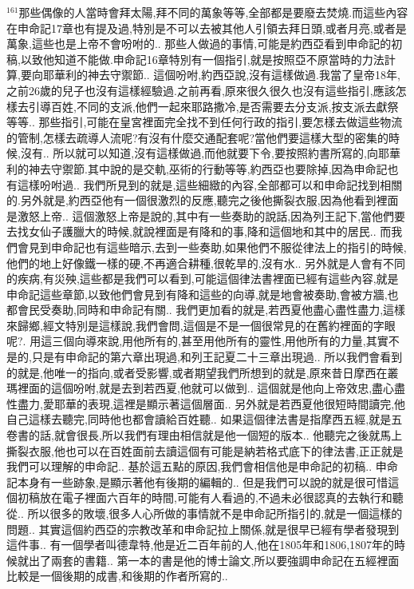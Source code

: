 \documentclass{book}
\begin{document}
$^{161}$那些偶像的人當時會拜太陽,拜不同的萬象等等,全部都是要廢去焚燒.而這些內容在申命記17章也有提及過,特別是不可以去被其他人引領去拜日頭,或者月亮,或者是萬象,這些也是上帝不會吩咐的..
那些人做過的事情,可能是約西亞看到申命記的初稿,以致他知道不能做.申命記16章特別有一個指引,就是按照亞不原當時的力法計算,要向耶華利的神去守禦節..
這個吩咐,約西亞說,沒有這樣做過.我當了皇帝18年,之前26歲的兒子也沒有這樣經驗過.之前再看,原來很久很久也沒有這些指引,應該怎樣去引導百姓,不同的支派,他們一起來耶路撒冷,是否需要去分支派,按支派去獻祭等等..
那些指引,可能在皇宮裡面完全找不到任何行政的指引,要怎樣去做這些物流的管制,怎樣去疏導人流呢?有沒有什麼交通配套呢?當他們要這樣大型的密集的時候,沒有..
所以就可以知道,沒有這樣做過,而他就要下令,要按照約書所寫的,向耶華利的神去守禦節.其中說的是交軌,巫術的行動等等,約西亞也要除掉,因為申命記也有這樣吩咐過..
我們所見到的就是,這些細緻的內容,全部都可以和申命記找到相關的.另外就是,約西亞他有一個很激烈的反應,聽完之後他撕裂衣服,因為他看到裡面是激怒上帝..
這個激怒上帝是說的,其中有一些奏助的說話,因為列王記下,當他們要去找女仙子護臘大的時候,就說裡面是有降和的事,降和這個地和其中的居民..
而我們會見到申命記也有這些暗示,去到一些奏助,如果他們不服從律法上的指引的時候,他們的地上好像鐵一樣的硬,不再適合耕種,很乾旱的,沒有水..
另外就是人會有不同的疾病,有災殃,這些都是我們可以看到,可能這個律法書裡面已經有這些內容,就是申命記這些章節,以致他們會見到有降和這些的向導,就是地會被奏助,會被方牆,也都會民受奏助,同時和申命記有關..
我們更加看的就是,若西夏他盡心盡性盡力,這樣來歸鄉,經文特別是這樣說,我們會問,這個是不是一個很常見的在舊約裡面的字眼呢?.
用這三個向導來說,用他所有的,甚至用他所有的靈性,用他所有的力量,其實不是的,只是有申命記的第六章出現過,和列王記夏二十三章出現過..
所以我們會看到的就是,他唯一的指向,或者受影響,或者期望我們所想到的就是,原來昔日摩西在叢瑪裡面的這個吩咐,就是去到若西夏,他就可以做到..
這個就是他向上帝效忠,盡心盡性盡力,愛耶華的表現,這裡是顯示著這個層面..
另外就是若西夏他很短時間讀完,他自己這樣去聽完,同時他也都會讀給百姓聽..
如果這個律法書是指摩西五經,就是五卷書的話,就會很長,所以我們有理由相信就是他一個短的版本..
他聽完之後就馬上撕裂衣服,他也可以在百姓面前去讀這個有可能是納若格式底下的律法書,正正就是我們可以理解的申命記..
基於這五點的原因,我們會相信他是申命記的初稿..
申命記本身有一些跡象,是顯示著他有後期的編輯的..
但是我們可以說的就是很可惜這個初稿放在電子裡面六百年的時間,可能有人看過的,不過未必很認真的去執行和聽從..
所以很多的敗壞,很多人心所做的事情就不是申命記所指引的,就是一個這樣的問題..
其實這個約西亞的宗教改革和申命記拉上關係,就是很早已經有學者發現到這件事..
有一個學者叫德韋特,他是近二百年前的人,他在1805年和1806,1807年的時候就出了兩套的書籍..
第一本的書是他的博士論文,所以要強調申命記在五經裡面比較是一個後期的成書,和後期的作者所寫的..
\end{document}
